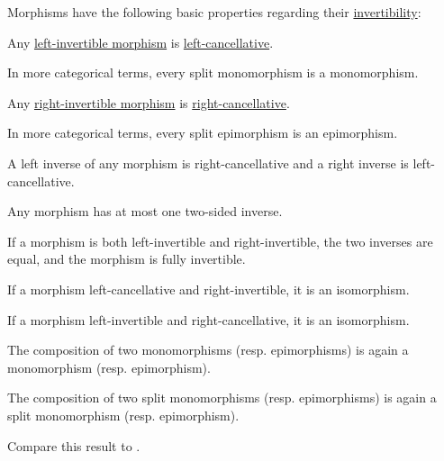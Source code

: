 \begin{proposition}\label{thm:def:morphism_invertibility/properties}
  Morphisms have the following basic properties regarding their \hyperref[def:morphism_invertibility]{invertibility}:

  \begin{thmenum}
     Any \hyperref[def:morphism_invertibility/left_invertible]{left-invertible morphism} is \hyperref[def:morphism_invertibility/left_cancellative]{left-cancellative}.

    In more categorical terms, every split monomorphism is a monomorphism.

     Any \hyperref[def:morphism_invertibility/right_invertible]{right-invertible morphism} is \hyperref[def:morphism_invertibility/right_cancellative]{right-cancellative}.

    In more categorical terms, every split epimorphism is an epimorphism.

     A left inverse of any morphism is right-cancellative and a right inverse is left-cancellative.

     Any morphism has at most one two-sided inverse.

     If a morphism is both left-invertible and right-invertible, the two inverses are equal, and the morphism is fully invertible.

     If a morphism left-cancellative and right-invertible, it is an isomorphism.

     If a morphism left-invertible and right-cancellative, it is an isomorphism.

     The composition of two monomorphisms (resp. epimorphisms) is again a monomorphism (resp. epimorphism).

     The composition of two split monomorphisms (resp. epimorphisms) is again a split monomorphism (resp. epimorphism).

    Compare this result to .
  \end{thmenum}
\end{proposition}

